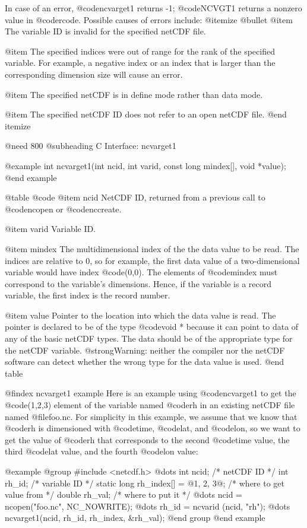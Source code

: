 In case of an error, @code{ncvarget1} returns -1; @code{NCVGT1} returns
a nonzero value in @code{rcode}.  Possible causes of errors include:
@itemize @bullet
@item
The variable ID is invalid for the specified netCDF file.

@item
The specified indices were out of range for the rank of the
specified variable.  For example, a negative index or an index that is
larger than the corresponding dimension size will cause an error.

@item
The specified netCDF is in define mode rather than data mode.

@item
The specified netCDF ID does not refer to an open netCDF file.
@end itemize

@need 800
@subheading C Interface:  ncvarget1

@example
int ncvarget1(int ncid, int varid, const long mindex[], void *value);
@end example

@table @code
@item ncid
NetCDF ID, returned from a previous call to @code{ncopen} or
@code{nccreate}.

@item varid
Variable ID.

@item mindex
The multidimensional index of the the data value to be read.  The
indices are relative to 0, so for example, the first data value of a
two-dimensional variable would have index @code{(0,0)}.  The elements of
@code{mindex} must correspond to the variable's dimensions.  Hence, if
the variable is a record variable, the first index is the record number.

@item value
Pointer to the location into which the data value is read.  The pointer
is declared to be of the type @code{void *} because it can point to data
of any of the basic netCDF types.  The data should be of the appropriate
type for the netCDF variable.  @strong{Warning: neither the compiler nor
the netCDF software can detect whether the wrong type for the data value
is used.}
@end table

@findex ncvarget1 example
Here is an example using @code{ncvarget1} to get the @code{(1,2,3)}
element of the variable named @code{rh} in an existing netCDF file named
@file{foo.nc}.  For simplicity in this example, we assume that we know
that @code{rh} is dimensioned with @code{time}, @code{lat}, and
@code{lon}, so we want to get the value of @code{rh} that corresponds to
the second @code{time} value, the third @code{lat} value, and the fourth
@code{lon} value:

@example
@group
#include <netcdf.h>
   @dots{}
int ncid;                              /* netCDF ID */
int rh_id;                             /* variable ID */
static long rh_index[] = @{1, 2, 3@};  /* where to get value from */
double rh_val;                         /* where to put it */
   @dots{}
ncid = ncopen("foo.nc", NC_NOWRITE);
   @dots{}
rh_id = ncvarid (ncid, "rh");
   @dots{}
ncvarget1(ncid, rh_id, rh_index, &rh_val);
@end group
@end example

